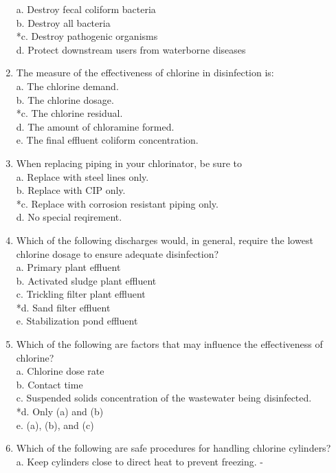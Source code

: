 \begin{enumerate}
a. Destroy fecal coliform bacteria \\
b. Destroy all bacteria \\
*c. Destroy pathogenic organisms \\
d. Protect downstream users from waterborne diseases \\
\item The measure of the effectiveness of chlorine in disinfection is: \\
a. The chlorine demand. \\
b. The chlorine dosage. \\
*c. The chlorine residual. \\
d. The amount of chloramine formed. \\
e. The final effluent coliform concentration. \\
\item When replacing piping in your chlorinator, be sure to \\
a. Replace with steel lines only. \\
b. Replace with CIP only. \\
*c. Replace with corrosion resistant piping only. \\
d. No special reqirement. \\
\item Which of the following discharges would, in general, require the lowest chlorine dosage to ensure adequate disinfection? \\
a. Primary plant effluent \\
b. Activated sludge plant effluent \\
c. Trickling filter plant effluent \\
*d. Sand filter effluent \\
e. Stabilization pond effluent \\
\item Which of the following are factors that may influence the effectiveness of chlorine? \\
a. Chlorine dose rate \\
b. Contact time \\
c. Suspended solids concentration of the wastewater being disinfected. \\
*d. Only (a) and (b) \\
e. (a), (b), and (c) \\
\item Which of the following are safe procedures for handling chlorine cylinders? \\
a. Keep cylinders close to direct heat to prevent freezing. - \\

\end{enumerate}
